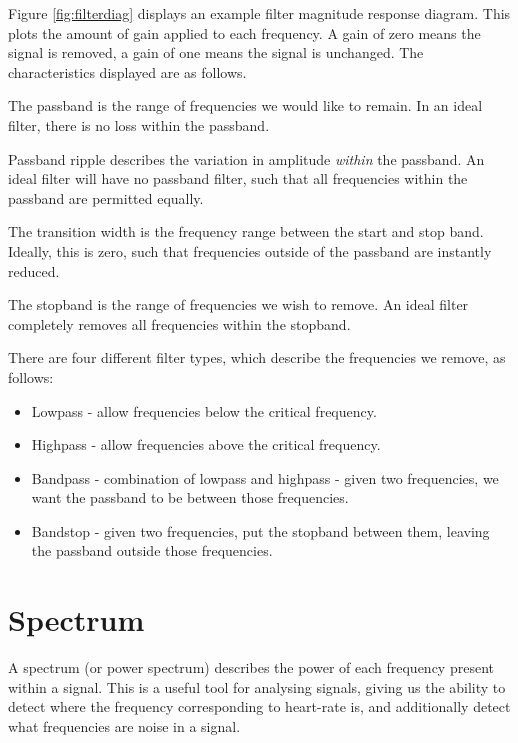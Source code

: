 \documentclass[12pt,a4paper,twoside,openright]{report}
\begin{document}
Figure \ref{fig:filterdiag} displays an example filter magnitude response
diagram. This plots the amount of gain applied to each frequency. A gain of
zero means the signal is removed, a gain of one means the signal is unchanged.
The characteristics displayed are as follows.

The passband is the range of frequencies we would like to remain. In an ideal
filter, there is no loss within the passband.

Passband ripple describes the variation in amplitude \emph{within} the
passband. An ideal filter will have no passband filter, such that all
frequencies within the passband are permitted equally.

The transition width is the frequency range between the start and stop band.
Ideally, this is zero, such that frequencies outside of the passband are
instantly reduced.

The stopband is the range of frequencies we wish to remove. An ideal filter
completely removes all frequencies within the stopband.

There are four different filter types, which describe the frequencies we remove, as
follows:

\begin{itemize}
	\item Lowpass - allow frequencies below the critical frequency.

	\item Highpass - allow frequencies above the critical frequency.

	\item Bandpass - combination of lowpass and highpass - given two
		frequencies, we want the passband to be between those
		frequencies.

	\item Bandstop - given two frequencies, put the stopband between them,
		leaving the passband outside those frequencies.
\end{itemize}

\section{Spectrum}

A spectrum (or power spectrum) describes the power of each frequency present
within a signal.
This is a useful tool for analysing signals, giving us the ability to detect
where the frequency corresponding to heart-rate is, and additionally detect
what frequencies are noise in a signal.
\end{document}
